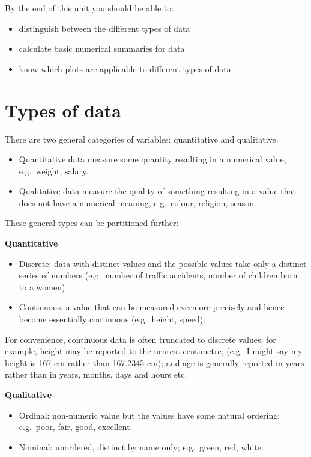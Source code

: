 \documentclass[
  oneside]{krantz}
\begin{document}
By the end of this unit you should be able to:

\begin{itemize}
\item
  distinguish between the different types of data
\item
  calculate basic numerical summaries for data
\item
  know which plots are applicable to different types of data.
\end{itemize}

\hypertarget{types-of-data}{%
\section{Types of data}\label{types-of-data}}

There are two general categories of variables: quantitative and qualitative.

\begin{itemize}
\item
  Quantitative data measure some quantity resulting in a numerical value, e.g.~weight, salary.
\item
  Qualitative data measure the quality of something resulting in a value that does not have a numerical meaning, e.g.~colour, religion, season.
\end{itemize}

These general types can be partitioned further:

\textbf{Quantitative}

\begin{itemize}
\item
  Discrete: data with distinct values and the possible values take only a distinct series of numbers (e.g.~number of traffic accidents, number of children born to a women)
\item
  Continuous: a value that can be measured evermore precisely and hence become essentially continuous (e.g.~height, speed).
\end{itemize}

For convenience, continuous data is often truncated to discrete values: for example, height may be reported to the nearest centimetre, (e.g.~I might say my height is 167 cm rather than 167.2345 cm); and age is generally reported in years rather than in years, months, days and hours etc.

\textbf{Qualitative}

\begin{itemize}
\item
  Ordinal: non-numeric value but the values have some natural ordering; e.g.~poor, fair, good, excellent.
\item
  Nominal: unordered, distinct by name only; e.g.~green, red, white.
\end{itemize}
\end{document}
